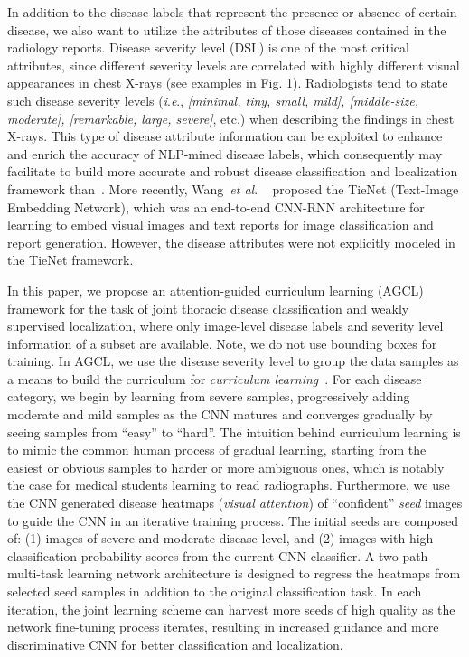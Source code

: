 \documentclass[runningheads,a4paper]{llncs}
\newcommand{\etal}{\textit{et al}. }
\newcommand{\ie}{\textit{i}.\textit{e}.}
\begin{document}
In addition to the disease labels that represent the presence or absence of certain disease, we also want to utilize the attributes of those diseases contained in the radiology reports. Disease severity level (DSL) is one of the most critical attributes, since different severity levels are correlated with highly different visual appearances in chest X-rays (see examples in Fig. 1). Radiologists tend to state such disease severity levels (\ie, \textit{[minimal, tiny, small, mild], [middle-size, moderate], [remarkable, large, severe]}, etc.) when describing the findings in chest X-rays. This type of disease attribute information can be exploited to enhance and enrich the accuracy of NLP-mined disease labels, which consequently may facilitate to build more accurate and robust disease classification and localization framework than~\cite{Wang_CVPR2017}. More recently, Wang~\etal~\cite{Wang_2018_CVPR} proposed the TieNet (Text-Image Embedding Network), which was an end-to-end CNN-RNN architecture for learning to embed visual images and text reports for image classification and report generation. However, the disease attributes were not explicitly modeled in the TieNet framework.

In this paper, we propose an attention-guided curriculum learning (AGCL) framework for the task of joint thoracic disease classification and weakly supervised localization, where only image-level disease labels and severity level information of a subset are available. Note, we do not use bounding boxes for training. In AGCL, we use the disease severity level to group the data samples as a means to build the curriculum for \textit{curriculum learning}~\cite{bengio_icml2009}. For each disease category, we begin by learning from severe samples, progressively adding moderate and mild samples as the CNN matures and converges gradually by seeing samples from ``easy'' to ``hard''. The intuition behind curriculum learning is to mimic the common human process of gradual learning, starting from the easiest or obvious samples to harder or more ambiguous ones, which is notably the case for medical students learning to read radiographs. Furthermore, we use the CNN generated disease heatmaps (\textit{visual attention}) of ``confident'' \textit{seed} images to guide the CNN in an iterative training process. The initial seeds are composed of: (1) images of severe and moderate disease level, and (2) images with high classification probability scores from the current CNN classifier. A two-path multi-task learning network architecture is designed to regress the heatmaps from selected seed samples in addition to the original classification task. In each iteration, the joint learning scheme can harvest more seeds of high quality as the network fine-tuning process iterates, resulting in increased guidance and more discriminative CNN for better classification and localization.
\end{document}
